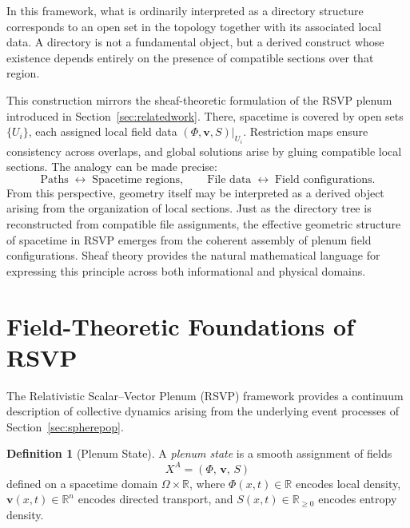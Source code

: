\documentclass[12pt,a4paper]{article}
\theoremstyle{plain}
\theoremstyle{definition}
\newtheorem{definition}{Definition}
\theoremstyle{remark}
\begin{document}
In this framework, what is ordinarily interpreted as a directory
structure corresponds to an open set in the topology together with its
associated local data. A directory is not a fundamental object, but a
derived construct whose existence depends entirely on the presence of
compatible sections over that region.

This construction mirrors the sheaf-theoretic formulation of the RSVP
plenum introduced in Section~\ref{sec:relatedwork}. There, spacetime is
covered by open sets $\{U_i\}$, each assigned local field data
$(\Phi,\mathbf{v},S)|_{U_i}$. Restriction maps ensure consistency
across overlaps, and global solutions arise by gluing compatible local
sections. The analogy can be made precise:
\begin{equation}
\text{Paths} \;\longleftrightarrow\; \text{Spacetime regions}, \qquad
\text{File data} \;\longleftrightarrow\; \text{Field configurations}.
\end{equation}
From this perspective, geometry itself may be interpreted as a derived
object arising from the organization of local sections. Just as the
directory tree is reconstructed from compatible file assignments, the
effective geometric structure of spacetime in RSVP emerges from the
coherent assembly of plenum field configurations. Sheaf theory provides
the natural mathematical language for expressing this principle across
both informational and physical domains.

\section{Field-Theoretic Foundations of RSVP}
\label{sec:foundations}

The Relativistic Scalar--Vector Plenum (RSVP) framework provides a
continuum description of collective dynamics arising from the underlying
event processes of Section~\ref{sec:spherepop}.

\begin{definition}[Plenum State]
A \emph{plenum state} is a smooth assignment of fields
\begin{equation}
X^A = (\Phi,\, \mathbf{v},\, S)
\end{equation}
defined on a spacetime domain $\Omega \times \mathbb{R}$, where
$\Phi(x,t) \in \mathbb{R}$ encodes local density, $\mathbf{v}(x,t)
\in \mathbb{R}^n$ encodes directed transport, and $S(x,t) \in
\mathbb{R}_{\geq 0}$ encodes entropy density.
\end{definition}
\end{document}
